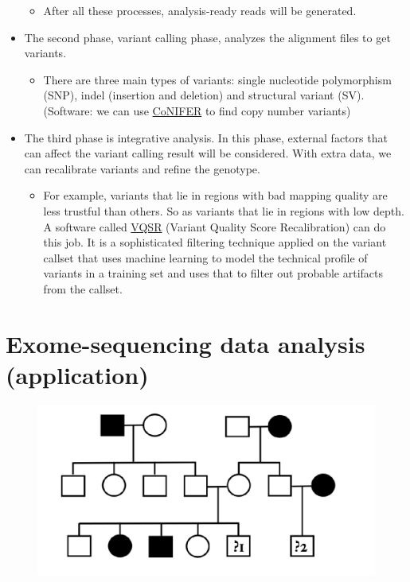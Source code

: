 \documentclass{article}
\begin{document}
\begin{itemize}
\begin{itemize}
        \item After all these processes, analysis-ready reads will be generated. 
    \end{itemize}
    \item The second phase, variant calling phase, analyzes the alignment files to get variants. 
    \begin{itemize}
        \item There are three main types of variants: single nucleotide polymorphism (SNP), indel (insertion and deletion) and structural variant (SV). (Software: we can use \href{https://conifer.sourceforge.net/}{CoNIFER} to find copy number variants)
    \end{itemize}
    
    \item The third phase is integrative analysis. In this phase, external factors that can affect the variant calling result will be considered. With extra data, we can recalibrate variants and refine the genotype.
    \begin{itemize}
        \item For example, variants that lie in regions with bad mapping quality are less trustful than others. So as variants that lie in regions with low depth. A software called \href{https://gatk.broadinstitute.org/hc/en-us/articles/360035531612-Variant-Quality-Score-Recalibration-VQSR-}{VQSR} (Variant Quality Score Recalibration) can do this job. It is a sophisticated filtering technique applied on the variant callset that uses machine learning to model the technical profile of variants in a training set and uses that to filter out probable artifacts from the callset.
    \end{itemize}
\end{itemize}

\section{Exome-sequencing data analysis (application)}
\begin{figure}[h]
    \centering
    \includegraphics[scale=0.4]{A1-Image/Tree.png}
\end{figure}
\end{document}
